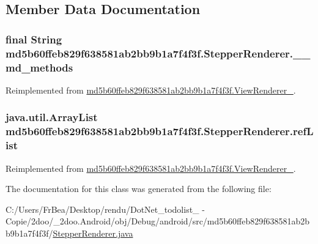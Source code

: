 \subsection{Member Data Documentation}
\hypertarget{classmd5b60ffeb829f638581ab2bb9b1a7f4f3f_1_1_stepper_renderer_e75360821f2ab13475b89986650b0f66}{
\subsubsection[{\_\-\_\-md\_\-methods}]{\setlength{\rightskip}{0pt plus 5cm}final String {\bf md5b60ffeb829f638581ab2bb9b1a7f4f3f.StepperRenderer.\_\-\_\-md\_\-methods}}}
\label{classmd5b60ffeb829f638581ab2bb9b1a7f4f3f_1_1_stepper_renderer_e75360821f2ab13475b89986650b0f66}




Reimplemented from \hyperlink{classmd5b60ffeb829f638581ab2bb9b1a7f4f3f_1_1_view_renderer__2_80b609e3e4054c380887d4dc2907a875}{md5b60ffeb829f638581ab2bb9b1a7f4f3f.ViewRenderer\_}.\hypertarget{classmd5b60ffeb829f638581ab2bb9b1a7f4f3f_1_1_stepper_renderer_35d2d1141b611523dcf58cee9210fd42}{
\subsubsection[{refList}]{\setlength{\rightskip}{0pt plus 5cm}java.util.ArrayList {\bf md5b60ffeb829f638581ab2bb9b1a7f4f3f.StepperRenderer.refList}}}
\label{classmd5b60ffeb829f638581ab2bb9b1a7f4f3f_1_1_stepper_renderer_35d2d1141b611523dcf58cee9210fd42}




Reimplemented from \hyperlink{classmd5b60ffeb829f638581ab2bb9b1a7f4f3f_1_1_view_renderer__2_6c151401977148a92c515e9c7de1aaf8}{md5b60ffeb829f638581ab2bb9b1a7f4f3f.ViewRenderer\_}.

The documentation for this class was generated from the following file:\begin{CompactItemize}
\item 
C:/Users/FrBea/Desktop/rendu/DotNet\_\-todolist\_ - Copie/2doo/\_\-2doo.Android/obj/Debug/android/src/md5b60ffeb829f638581ab2bb9b1a7f4f3f/\hyperlink{_stepper_renderer_8java}{StepperRenderer.java}\end{CompactItemize}
